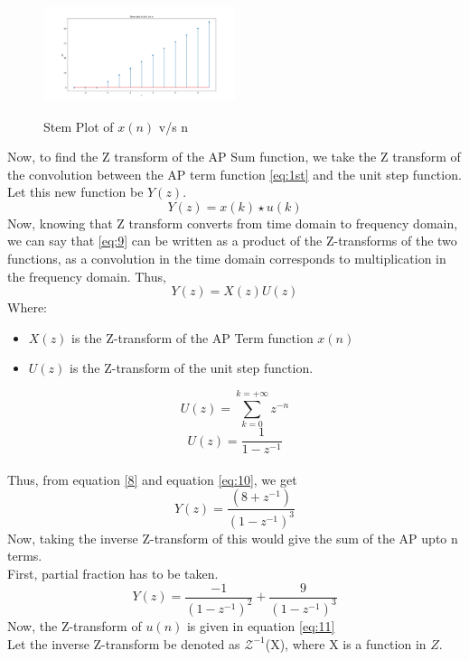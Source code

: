 \documentclass[journal,12pt,twocolumn]{IEEEtran}
\theoremstyle{remark}
\begin{document}
\begin{flushleft}
\begin{figure}[h]
\renewcommand\thefigure{1}
    \caption{Stem Plot of $x(n)$ v/s n}
    \includegraphics[width=0.5\textwidth]{figs/x(n)_plot.png}
    \label{fig:stem-plot}
\end{figure}
\end{flushleft}
Now, to find the Z transform of the AP Sum function, we take the Z transform of the convolution between the AP term function \ref{eq:1st} and the unit step function. Let this new function be $Y(z)$.
\begin{equation}\label{eq:9}
    Y(z) = x(k)\star u(k)
\end{equation}
Now, knowing that Z transform converts from time domain to frequency domain, we can say that \ref{eq:9} can be written as a product of the Z-transforms of the two functions, as a convolution in the time domain corresponds to multiplication in the frequency domain.
Thus,
\begin{equation}\label{eq:10}
    Y(z) = X(z)U(z)
\end{equation}
Where:
\begin{itemize}
    \item $X(z)$ is the Z-transform of the AP Term function $x(n)$
    \item $U(z)$ is the Z-transform of the unit step function.
\end{itemize}
$$U(z) = \sum_{k=0}^{k=+\infty}z^{-n}$$
\begin{equation}\label{eq:11}
    U(z) = \frac{1}{1-z^{-1}}
\end{equation}\\Thus, from equation \ref{8} and equation \ref{eq:10}, we get
$$Y(z) = \frac{(8+z^{-1})}{(1-z^{-1})^{3}}$$
Now, taking the inverse Z-transform of this would give the sum of the AP upto n terms.\\
\bigskip
First, partial fraction has to be taken.
$$Y(z) = \frac{-1}{(1-z^{-1})^2} + \frac{9}{(1-z^{-1})^3}$$
Now, the Z-transform of $u(n)$ is given in equation \ref{eq:11}\\
Let the inverse Z-transform be denoted as $\mathcal{Z}^{-1}$(X), where X is a function in $Z$.\\
\end{document}
